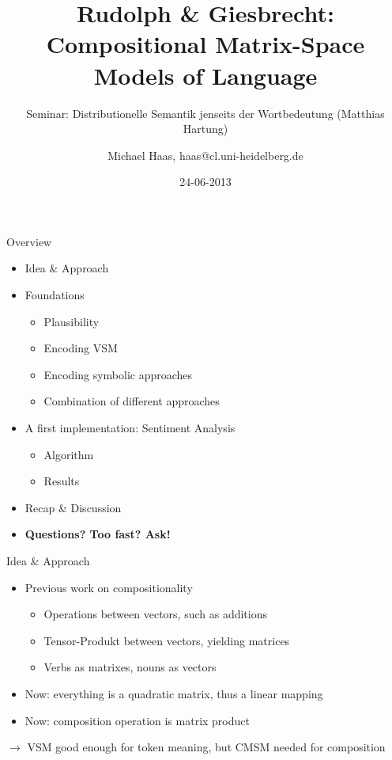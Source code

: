 \documentclass[12pt,a4paper]{beamer}
\author{Michael Haas, haas@cl.uni-heidelberg.de}
\title{Rudolph \& Giesbrecht: Compositional Matrix-Space Models of Language}
\subtitle{Seminar: Distributionelle Semantik jenseits der Wortbedeutung (Matthias Hartung)}
\date{24-06-2013}
\begin{document}
\begin{frame}
\maketitle
\end{frame}

\begin{frame}{Overview}
\begin{itemize}
\item Idea \& Approach %
\item Foundations
\begin{itemize}
    \item Plausibility %
    \item Encoding VSM %
    \item Encoding symbolic approaches
    \item Combination of different approaches
\end{itemize}
\item A first implementation: Sentiment Analysis
\begin{itemize}
    \item Algorithm %
    \item Results %
\end{itemize}
\item Recap \& Discussion
\item \textbf{Questions? Too fast? Ask!}
\end{itemize}
\end{frame}

\begin{frame}{Idea \& Approach}
\begin{itemize}
\item Previous work on compositionality
    \begin{itemize}
    \item Operations between vectors, such as additions
    \item Tensor-Produkt between vectors, yielding matrices %
    \item Verbs as matrixes, nouns as vectors
\end{itemize}
\item Now: everything is a quadratic matrix, thus a linear mapping
\item Now: composition operation is matrix product
\end{itemize}
$\to$ VSM good enough for token meaning, but CMSM needed for composition
\end{frame}
\end{document}
